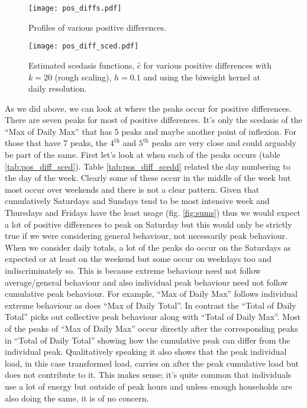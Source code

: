 \documentclass[a4paper]{article}
\begin{document}
\begin{figure}
\centering
\texttt{[image: pos\_diffs.pdf]}
\caption{\label{fig:pos_diff} Profiles of various positive differences.}
\end{figure}

\begin{figure}
\texttt{[image: pos\_diff\_sced.pdf]}
\caption{\label{fig:pos_diff_sced} Estimated scedasis functions, $\hat{c}$ for various positive differences with $k=20$ (rough scaling), $h=0.1$ and using the biweight kernel at daily resolution.}
\end{figure}

As we did above, we can look at where the peaks occur for positive differences. There are seven peaks for most of positive differences. It's only the scedasis of the ``Max of Daily Max'' that has 5 peaks and maybe another point of inflexion. For those that have 7 peaks, the $4^{\text{th}}$ and $5^{\text{th}}$ peaks are very close and could arguably be part of the same. First let's look at when each of the peaks occurs (table \ref{tab:pos_diff_sced}). Table \ref{tab:pos_diff_scedd} related the day numbering to the day of the week. Clearly some of these occur in the middle of the week but most occur over weekends and there is not a clear pattern. Given that cumulatively Saturdays and Sundays tend to be most intensive week and Thursdays and Fridays have the least usage (fig. \ref{fig:sums}) thus we would expect a lot of positive differences to peak on Saturday but this would only be strictly true if we were considering general behaviour, not necessarily peak behaviour. When we consider daily totals, a lot of the peaks do occur on the Saturdays as expected or at least on the weekend but some occur on weekdays too and indiscriminately so. This is because extreme behaviour need not follow average/general behaviour and also individual peak behaviour need not follow cumulative peak behaviour.  For example, ``Max of Daily Max'' follows individual extreme behaviour as does ``Max of Daily Total''. In contrast the ``Total of Daily Total'' picks out collective peak behaviour along with ``Total of Daily Max''. Most of the peaks of ``Max of Daily Max'' occur directly after the corresponding peaks in ``Total of Daily Total'' showing how the cumulative peak can differ from the individual peak. Qualitatively speaking it also shows that the peak individual load, in this case transformed load, carries on after the peak cumulative load but does not contribute to it. This makes sense; it's quite common that individuals use a lot of energy but outside of peak hours and unless enough households are also doing the same, it is of no concern.
\end{document}
